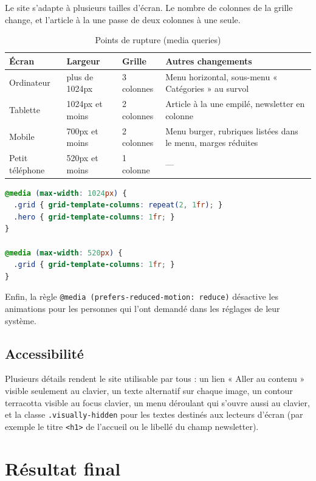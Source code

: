 \documentclass[12pt,a4paper]{article}
\newcommand{\code}[1]{\texttt{#1}}
\begin{document}
Le site s'adapte à plusieurs tailles d'écran. Le nombre de colonnes de la
grille change, et l'article à la une passe de deux colonnes à une seule.

\begin{table}[H]
  \centering
  \small
  \begin{tabularx}{\textwidth}{l l l X}
    \toprule
    \textbf{Écran} & \textbf{Largeur} & \textbf{Grille} & \textbf{Autres changements} \\
    \midrule
    Ordinateur & plus de 1024px & 3 colonnes & Menu horizontal, sous-menu « Catégories » au survol \\
    Tablette & 1024px et moins & 2 colonnes & Article à la une empilé, newsletter en colonne \\
    Mobile & 700px et moins & 2 colonnes & Menu burger, rubriques listées dans le menu, marges réduites \\
    Petit téléphone & 520px et moins & 1 colonne & --- \\
    \bottomrule
  \end{tabularx}
  \caption{Points de rupture (media queries)}
\end{table}

\begin{lstlisting}[language=CSS]
@media (max-width: 1024px) {
  .grid { grid-template-columns: repeat(2, 1fr); }
  .hero { grid-template-columns: 1fr; }
}

@media (max-width: 520px) {
  .grid { grid-template-columns: 1fr; }
}
\end{lstlisting}

Enfin, la règle \code{@media (prefers-reduced-motion: reduce)} désactive
les animations pour les personnes qui l'ont demandé dans les réglages de
leur système.

\subsection{Accessibilité}

Plusieurs détails rendent le site utilisable par tous : un lien « Aller
au contenu » visible seulement au clavier, un texte alternatif sur chaque
image, un contour terracotta visible au focus clavier, un menu déroulant
qui s'ouvre aussi au clavier, et la classe \code{.visually-hidden} pour
les textes destinés aux lecteurs d'écran (par exemple le titre
\code{<h1>} de l'accueil ou le libellé du champ newsletter).

\clearpage
\section{Résultat final}
\end{document}
